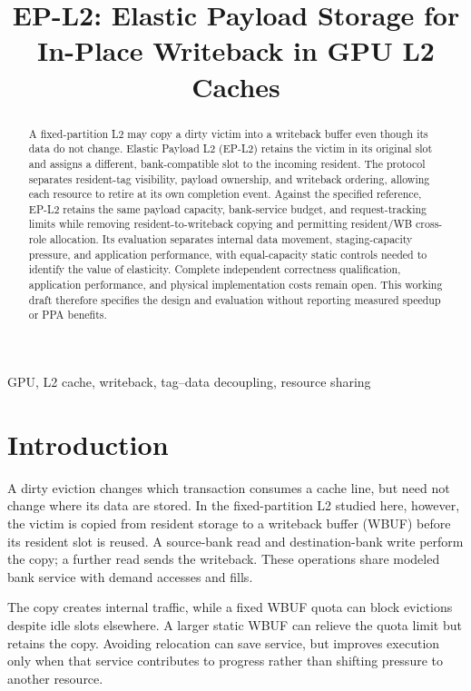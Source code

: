 \documentclass[conference,letterpaper]{IEEEtran}
\begin{document}
\title{EP-L2: Elastic Payload Storage for\\In-Place Writeback in GPU L2 Caches}
\author{}
\maketitle
\begin{abstract}
A fixed-partition L2 may copy a dirty victim into a writeback buffer even though its data do not change. Elastic Payload L2 (EP-L2) retains the victim in its original slot and assigns a different, bank-compatible slot to the incoming resident. The protocol separates resident-tag visibility, payload ownership, and writeback ordering, allowing each resource to retire at its own completion event. Against the specified reference, EP-L2 retains the same payload capacity, bank-service budget, and request-tracking limits while removing resident-to-writeback copying and permitting resident/WB cross-role allocation. Its evaluation separates internal data movement, staging-capacity pressure, and application performance, with equal-capacity static controls needed to identify the value of elasticity. Complete independent correctness qualification, application performance, and physical implementation costs remain open. This working draft therefore specifies the design and evaluation without reporting measured speedup or PPA benefits.
\end{abstract}
\begin{IEEEkeywords}
GPU, L2 cache, writeback, tag--data decoupling, resource sharing
\end{IEEEkeywords}

\section{Introduction}
A dirty eviction changes which transaction consumes a cache line, but need not change where its data are stored. In the fixed-partition L2 studied here, however, the victim is copied from resident storage to a writeback buffer (WBUF) before its resident slot is reused. A source-bank read and destination-bank write perform the copy; a further read sends the writeback. These operations share modeled bank service with demand accesses and fills.

The copy creates internal traffic, while a fixed WBUF quota can block evictions despite idle slots elsewhere. A larger static WBUF can relieve the quota limit but retains the copy. Avoiding relocation can save service, but improves execution only when that service contributes to progress rather than shifting pressure to another resource.
\end{document}
